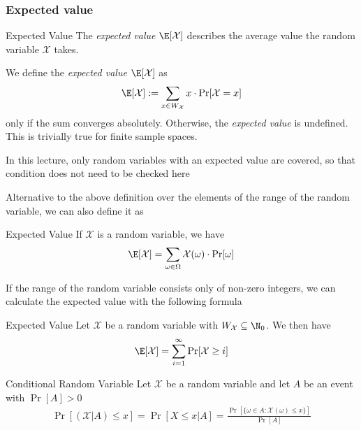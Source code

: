 \subsubsection{Expected value}
\setcounter{all}{27}
\begin{definition}[]{Expected Value}
    The \textit{expected value} $\E[\mathcal{X}]$ describes the average value the random variable $\mathcal{X}$ takes.

    We define the \textit{expected value} $\E[\mathcal{X}]$ as
    \[
        \E[\mathcal{X}] := \sum_{x \in W_{\mathcal{X}}} x \cdot \Pr[\mathcal{X} = x]
    \]
    only if the sum converges absolutely. Otherwise, the \textit{expected value} is undefined. This is trivially true for finite sample spaces.
\end{definition}
\begin{scriptsize}
    In this lecture, only random variables with an expected value are covered, so that condition does not need to be checked here
\end{scriptsize}

\setcounter{all}{29}
Alternative to the above definition over the elements of the range of the random variable, we can also define it as
\begin{lemma}[]{Expected Value}
    If $\mathcal{X}$ is a random variable, we have
    \[
        \E[\mathcal{X}] = \sum_{\omega \in \Omega} \mathcal{X}(\omega) \cdot \Pr[\omega]
    \]
\end{lemma}

If the range of the random variable consists only of non-zero integers, we can calculate the expected value with the following formula
\begin{theorem}[]{Expected Value}
    Let $\mathcal{X}$ be a random variable with $W_{\mathcal{X}} \subseteq \N_0$. We then have
    \begin{align*}
        \E[\mathcal{X}] = \sum_{i = 1}^{\infty} \Pr[\mathcal{X} \geq i]
    \end{align*}
\end{theorem}

\newpage
{}

\begin{definition}[]{Conditional Random Variable}
    Let $\mathcal{X}$ be a random variable and let $A$ be an event with $\Pr[A] > 0$
    \begin{align*}
        \Pr[(\mathcal{X} | A) \leq x] = \Pr[X \leq x | A] = \frac{\Pr[\{\omega \in A : \mathcal{X}(\omega) \leq x\}]}{\Pr[A]}
    \end{align*}
\end{definition}

